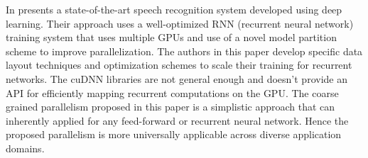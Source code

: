 In \cite{Hannun2014} presents a state-of-the-art speech recognition system developed using deep learning.
Their approach uses a well-optimized RNN (recurrent neural network) training system that uses multiple GPUs and use of a novel model partition
scheme to improve parallelization. The authors in this paper develop specific data layout techniques and optimization schemes to scale their training for recurrent networks. The cuDNN \cite{chetlur2014cudnn} libraries are not general enough and doesn't provide an API for efficiently mapping recurrent computations on the GPU. The coarse grained parallelism proposed in this paper is a simplistic approach that can inherently applied for any feed-forward or recurrent neural network. Hence the proposed parallelism is more universally applicable across diverse application domains.


